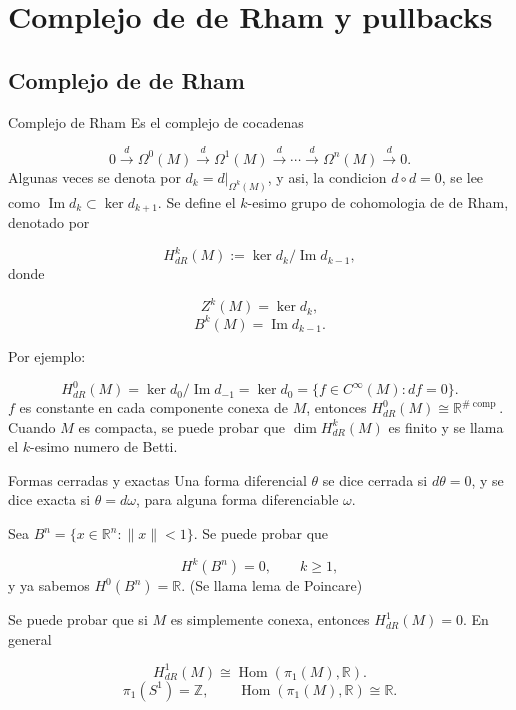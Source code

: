 \chapter{Complejo de de Rham y pullbacks}
\label{ch:teo-22}
\section{Complejo de de Rham}
\begin{bookdefinition}{Complejo de Rham}
Es el complejo de cocadenas

\[
0\xrightarrow{d}\Omega^0(M)\xrightarrow{d}\Omega^1(M)\xrightarrow{d}\cdots\xrightarrow{d}\Omega^n(M)\xrightarrow{d}0.
\]
Algunas veces se denota por $d_k=d|_{\Omega^k(M)}$, y asi, la condicion $d\circ d=0$, se lee como $\operatorname{Im}d_k\subset\ker d_{k+1}$. Se define el $k$-esimo grupo de cohomologia de de Rham, denotado por

\[
H^k_{dR}(M):=\ker d_k/\operatorname{Im}d_{k-1},
\]
donde

\[
Z^k(M)=\ker d_k,
\]
\[
B^k(M)=\operatorname{Im}d_{k-1}.
\]
\end{bookdefinition}
\begin{bookexample}{}
Por ejemplo:

\[
H^0_{dR}(M)=\ker d_0/\operatorname{Im}d_{-1}=\ker d_0=\{f\in C^\infty(M):df=0\}.
\]
$f$ es constante en cada componente conexa de $M$, entonces $H^0_{dR}(M)\cong\mathbb R^{\#\operatorname{comp}}$. Cuando $M$ es compacta, se puede probar que $\dim H^k_{dR}(M)$ es finito y se llama el $k$-esimo numero de Betti.

\end{bookexample}
\begin{bookdefinition}{Formas cerradas y exactas}
Una forma diferencial $\theta$ se dice cerrada si $d\theta=0$, y se dice exacta si $\theta=d\omega$, para alguna forma diferenciable $\omega$.

\end{bookdefinition}
\begin{bookexample}{}
Sea $B^n=\{x\in\mathbb R^n:\|x\|<1\}$. Se puede probar que

\[
H^k(B^n)=0,\qquad k\ge1,
\]
y ya sabemos $H^0(B^n)=\mathbb R$. (Se llama lema de Poincare)

\end{bookexample}
\begin{bookexample}{}
Se puede probar que si $M$ es simplemente conexa, entonces $H^1_{dR}(M)=0$. En general

\[
H^1_{dR}(M)\cong \operatorname{Hom}(\pi_1(M),\mathbb R).
\]
\[
\pi_1(S^1)=\mathbb Z,\qquad \operatorname{Hom}(\pi_1(M),\mathbb R)\cong\mathbb R.
\]
\end{bookexample}
